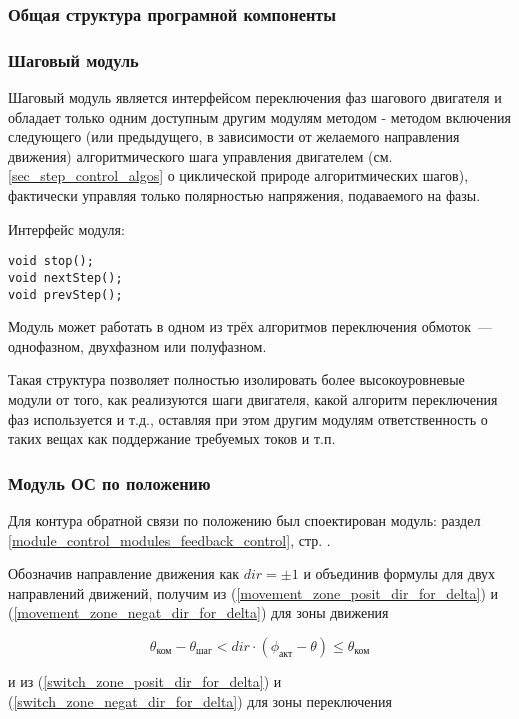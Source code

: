 \subsubsection{Общая структура програмной компоненты}
\subsubsection{Шаговый модуль}
Шаговый модуль является интерфейсом переключения фаз шагового двигателя и
обладает только одним доступным другим модулям методом - методом включения
следующего (или предыдущего, в зависимости от желаемого направления движения)
алгоритмического шага управления двигателем (см. \ref{sec_step_control_algos}
о циклической природе алгоритмических шагов), фактически управляя только
полярностью напряжения, подаваемого на фазы.

Интерфейс модуля:
\begin{lstlisting}
void stop();
void nextStep();
void prevStep();
\end{lstlisting}

Модуль может работать в одном из трёх
алгоритмов переключения обмоток~--- однофазном, двухфазном или полуфазном.

Такая структура позволяет полностью изолировать более высокоуровневые модули от
того, как реализуются шаги двигателя, какой алгоритм переключения фаз
используется и т.д., оставляя при этом другим модулям ответственность о таких вещах
как поддержание требуемых токов и т.п.

\subsubsection{Модуль ОС по положению}
Для контура обратной связи по положению был споектирован модуль:
раздел \ref{module_control_modules_feedback_control},
стр. \pageref{module_control_modules_feedback_control}.

Обозначив направление движения как $\textit{dir} = \pm 1$ и объединив формулы
для двух направлений движений, получим из (\ref{movement_zone_posit_dir_for_delta})
и (\ref{movement_zone_negat_dir_for_delta}) для зоны движения

\begin{equation}
    \label{movement_zone_for_delta}
    \theta_\textit{ком} - \theta_\textit{шаг}
    < dir \cdot (\phi_\textit{акт} - \theta)
    \leq \theta_\textit{ком}
\end{equation}

и из (\ref{switch_zone_posit_dir_for_delta})
и (\ref{switch_zone_negat_dir_for_delta}) для зоны переключения

